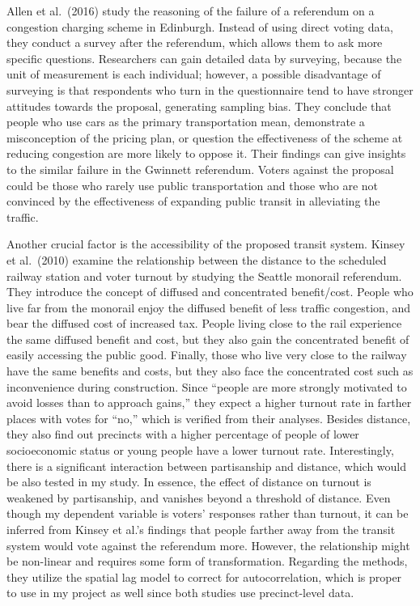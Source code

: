 \documentclass[
]{article}
\begin{document}
Allen et al.~(2016) study the reasoning of the failure of a referendum
on a congestion charging scheme in Edinburgh. Instead of using direct
voting data, they conduct a survey after the referendum, which allows
them to ask more specific questions. Researchers can gain detailed data
by surveying, because the unit of measurement is each individual;
however, a possible disadvantage of surveying is that respondents who
turn in the questionnaire tend to have stronger attitudes towards the
proposal, generating sampling bias. They conclude that people who use
cars as the primary transportation mean, demonstrate a misconception of
the pricing plan, or question the effectiveness of the scheme at
reducing congestion are more likely to oppose it. Their findings can
give insights to the similar failure in the Gwinnett referendum. Voters
against the proposal could be those who rarely use public transportation
and those who are not convinced by the effectiveness of expanding public
transit in alleviating the traffic.

Another crucial factor is the accessibility of the proposed transit
system. Kinsey et al.~(2010) examine the relationship between the
distance to the scheduled railway station and voter turnout by studying
the Seattle monorail referendum. They introduce the concept of diffused
and concentrated benefit/cost. People who live far from the monorail
enjoy the diffused benefit of less traffic congestion, and bear the
diffused cost of increased tax. People living close to the rail
experience the same diffused benefit and cost, but they also gain the
concentrated benefit of easily accessing the public good. Finally, those
who live very close to the railway have the same benefits and costs, but
they also face the concentrated cost such as inconvenience during
construction. Since ``people are more strongly motivated to avoid losses
than to approach gains,'' they expect a higher turnout rate in farther
places with votes for ``no,'' which is verified from their analyses.
Besides distance, they also find out precincts with a higher percentage
of people of lower socioeconomic status or young people have a lower
turnout rate. Interestingly, there is a significant interaction between
partisanship and distance, which would be also tested in my study. In
essence, the effect of distance on turnout is weakened by partisanship,
and vanishes beyond a threshold of distance. Even though my dependent
variable is voters' responses rather than turnout, it can be inferred
from Kinsey et al.'s findings that people farther away from the transit
system would vote against the referendum more. However, the relationship
might be non-linear and requires some form of transformation. Regarding
the methods, they utilize the spatial lag model to correct for
autocorrelation, which is proper to use in my project as well since both
studies use precinct-level data.
\end{document}
